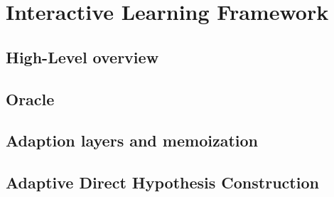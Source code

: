 \section{Interactive Learning Framework} \label{sec_interactivelearningframework}

\subsection{High-Level overview} \label{subsec_highleveloverview}

\subsection{Oracle} \label{subsec_oracleimpl}

\subsection{Adaption layers and memoization} \label{subsec_memoization}

\subsection{Adaptive Direct Hypothesis Construction} \label{subsec_adaptivedhc}

